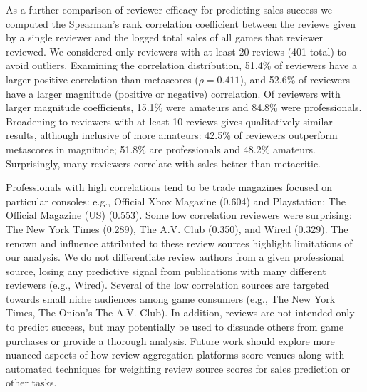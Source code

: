 \documentclass[letterpaper]{article}
\begin{document}
As a further comparison of reviewer efficacy for predicting sales success we computed the Spearman's rank correlation coefficient between the reviews given by a single reviewer and the logged total sales of all games that reviewer reviewed. We considered only reviewers with at least 20 reviews (401 total) to avoid outliers. Examining the correlation distribution, 51.4\% of reviewers have a larger positive correlation than metascores ($\rho = 0.411$), and 52.6\% of reviewers have a larger magnitude (positive or negative) correlation. Of reviewers with larger magnitude coefficients, 15.1\% were amateurs and 84.8\% were professionals.
Broadening to reviewers with at least 10 reviews gives qualitatively similar results, although inclusive of more amateurs: 42.5\% of reviewers outperform metascores in magnitude; 51.8\% are professionals and 48.2\% amateurs. 
Surprisingly, many reviewers correlate with sales better than metacritic.



Professionals with high correlations tend to be trade magazines focused on particular consoles: e.g., Official Xbox Magazine (0.604) and Playstation: The Official Magazine (US) (0.553).
Some low correlation reviewers were surprising: The New York Times (0.289), The A.V. Club (0.350), and Wired (0.329). The renown and influence attributed to these review sources highlight limitations of our analysis. We do not differentiate review authors from a given professional source, losing any predictive signal from publications with many different reviewers (e.g., Wired). Several of the low correlation sources are targeted towards small niche audiences among game consumers (e.g., The New York Times, The Onion's The A.V. Club). In addition, reviews are not intended only to predict success, but may potentially be used to dissuade others from game purchases or provide a thorough analysis. Future work should explore more nuanced aspects of how review aggregation platforms score venues along with automated techniques for weighting review source scores for sales prediction or other tasks.
\end{document}
